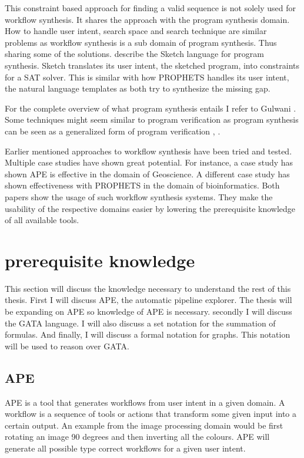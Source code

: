 \documentclass{article}
\begin{document}
This constraint based approach for finding a valid sequence is not solely used for workflow synthesis. It shares the approach with the program synthesis domain. How to handle user intent, search space and search technique \cite{gulwani2010dimensions} are similar problems as workflow synthesis is a sub domain of program synthesis. Thus sharing some of the solutions. \cite{solar2008program} describe the Sketch language for program synthesis. Sketch translates its user intent, the sketched program, into constraints for a SAT solver. This is similar with how PROPHETS handles its user intent, the natural language templates as both try to synthesize the missing gap. 


For the complete overview of what program synthesis entails I refer to Gulwani \cite{program_synthesis}. Some techniques might seem similar to program verification as program synthesis can be seen as a generalized form of program verification \cite{gulwani2011loopfree}, \cite{verificationToSynthesis}.


Earlier mentioned approaches to workflow synthesis have been tried and tested. Multiple case studies have shown great potential. For instance, a case study \cite{kasalica2019workflow} has shown APE is effective in the domain of Geoscience. A different case study \cite{palmblad2019automated} has shown effectiveness with PROPHETS in the domain of bioinformatics. Both papers show the usage of such workflow synthesis systems. They make the usability of the respective domains easier by lowering the prerequisite knowledge of all available tools. 

\section{prerequisite knowledge}
This section will discuss the knowledge necessary to understand the rest of this thesis. First I will discuss APE, the automatic pipeline explorer. The thesis will be expanding on APE so knowledge of APE is necessary. secondly I will discuss the GATA language. I will also discuss a set notation for the summation of formulas. And finally, I will discuss a formal notation for graphs. This notation will be used to reason over GATA. 


\subsection{APE}
APE is a tool that generates workflows from user intent in a given domain. A workflow is a sequence of tools or actions that transform some given input into a certain output. An example from the image processing domain would be first rotating an image 90 degrees and then inverting all the colours. APE will generate all possible type correct workflows for a given user intent.
\end{document}
